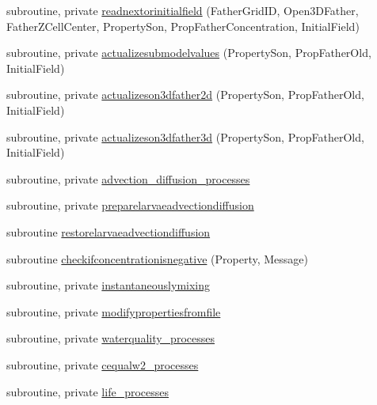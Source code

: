 \begin{DoxyCompactItemize}
\item 
subroutine, private \mbox{\hyperlink{namespacemodulewaterproperties_a70dce18437eed5f486027590c6d6a511}{readnextorinitialfield}} (Father\+Grid\+ID, Open3\+D\+Father, Father\+Z\+Cell\+Center, Property\+Son, Prop\+Father\+Concentration, Initial\+Field)
\item 
subroutine, private \mbox{\hyperlink{namespacemodulewaterproperties_a1c0bebcf1f9e3c75094930d29edfdcca}{actualizesubmodelvalues}} (Property\+Son, Prop\+Father\+Old, Initial\+Field)
\item 
subroutine, private \mbox{\hyperlink{namespacemodulewaterproperties_ab0b8edf280ffb8e69ae400f400b252c9}{actualizeson3dfather2d}} (Property\+Son, Prop\+Father\+Old, Initial\+Field)
\item 
subroutine, private \mbox{\hyperlink{namespacemodulewaterproperties_a300389c60d61f49a71a655925f38baab}{actualizeson3dfather3d}} (Property\+Son, Prop\+Father\+Old, Initial\+Field)
\item 
subroutine, private \mbox{\hyperlink{namespacemodulewaterproperties_a2450d655461a0013ffb3d932848b59b7}{advection\+\_\+diffusion\+\_\+processes}}
\item 
subroutine, private \mbox{\hyperlink{namespacemodulewaterproperties_ac64c0bef47a698a3d4ee6c542620ff58}{preparelarvaeadvectiondiffusion}}
\item 
subroutine \mbox{\hyperlink{namespacemodulewaterproperties_abd63efefa04ded5606dbc3b60797d347}{restorelarvaeadvectiondiffusion}}
\item 
subroutine \mbox{\hyperlink{namespacemodulewaterproperties_a1edbcfe150c3db4a47036d7e4bfcdda3}{checkifconcentrationisnegative}} (Property, Message)
\item 
subroutine, private \mbox{\hyperlink{namespacemodulewaterproperties_ac2912c1f90322adb405cc7d8f1d67898}{instantaneouslymixing}}
\item 
subroutine, private \mbox{\hyperlink{namespacemodulewaterproperties_a0b4d4f88a02be98e446a383c70ac8803}{modifypropertiesfromfile}}
\item 
subroutine, private \mbox{\hyperlink{namespacemodulewaterproperties_a330fc5f39079fff0948cbca492cf139a}{waterquality\+\_\+processes}}
\item 
subroutine, private \mbox{\hyperlink{namespacemodulewaterproperties_a77c662c86e2d882859f2a18d2cde59d1}{cequalw2\+\_\+processes}}
\item 
subroutine, private \mbox{\hyperlink{namespacemodulewaterproperties_ad72c8ac146887990ee173526b0a484f1}{life\+\_\+processes}}

\end{DoxyCompactItemize}
